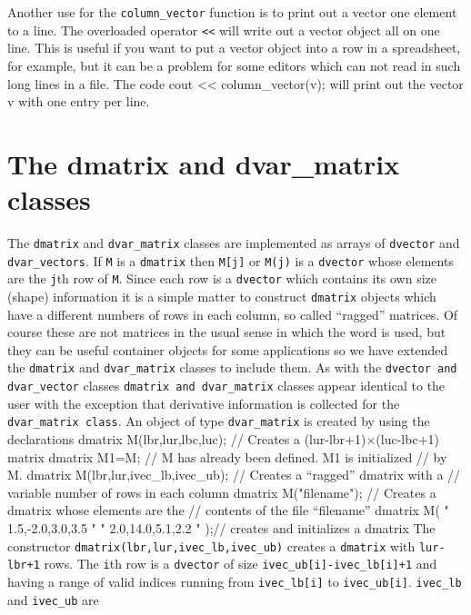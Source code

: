 \documentclass[12pt]{book}
\begin{document}
Another use for the {\tt column\_vector} function is to
print out a vector one element to a line. The overloaded
operator {\tt <<} will  write out a vector object all on
one line. This is useful if you want to put a vector object into a row
in a spreadsheet, for example, but it can be a problem for
some editors which can not read in such long lines in a file.
The code
\beginexample
cout << column_vector(v);
\endexample
\noindent will print out the vector v with one entry per line.
\section{The dmatrix and dvar\_matrix classes}
The {\tt dmatrix} and {\tt dvar\_matrix} classes
 are implemented
as arrays of {\tt dvector} and \hbox{\tt dvar\_vectors}. If {\tt M} is a
{\tt dmatrix} then {\tt M[j]} or {\tt M(j)} is a {\tt dvector}
whose elements are the {\tt j}th row of {\tt M}.
Since each row is a {\tt dvector} which contains its own size (shape)
information it is a simple matter to construct {\tt dmatrix} objects
which have a different numbers of rows in each column,
 so called ``ragged'' matrices. Of course these are not matrices in the
usual sense in which the word is used, 
but they can be useful container objects for
some applications so we have extended the  {\tt dmatrix} and
{\tt dvar\_matrix} classes
to include them.
As with the {\tt dvector and dvar\_vector} classes
{\tt dmatrix and dvar\_matrix} classes appear identical to
the user with the exception that derivative information
is collected for the {\tt dvar\_matrix class}.
An object of type {\tt dvar\_matrix} is created by using the declarations
\beginexamplea
dmatrix M(lbr,lur,lbc,luc); // Creates a (lur-lbr+1)$\times$(luc-lbc+1) matrix
dmatrix M1=M;               // M has already been defined. M1 is initialized 
                            // by M.
dmatrix M(lbr,lur,ivec_lb,ivec_ub); // Creates a ``ragged'' dmatrix with a 
                            // variable number of rows in each column
dmatrix M("filename");      // Creates a dmatrix whose elements are the 
                            // contents of the file ``filename''
dmatrix M( "{ 1.5,-2.0,3.0,3.5 }"
         "{ 2.0,14.0,5.1,2.2 }" );// creates and initializes a dmatrix
\endexample
The constructor {\tt dmatrix(lbr,lur,ivec\_lb,ivec\_ub)} 
creates a {\tt dmatrix} with {\tt lur-lbr+1} rows. The {\tt i}th row
is a {\tt dvector} of size {\tt ivec\_ub[i]-ivec\_lb[i]+1} and having
a range of valid indices running from {\tt ivec\_lb[i]} to
{\tt ivec\_ub[i]}. {\tt ivec\_lb} and {\tt ivec\_ub} are
\end{document}
